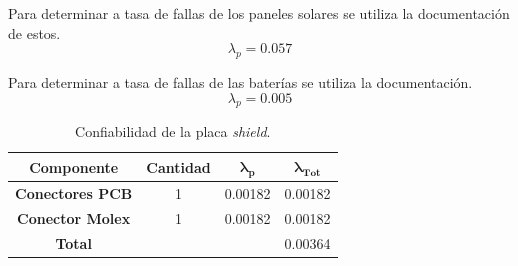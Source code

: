 Para determinar a tasa de fallas de los paneles solares se utiliza la documentación de estos.
\begin{equation}
\lambda_p = 0.057 
\end{equation}

Para determinar a tasa de fallas de las baterías se utiliza la documentación.
\begin{equation}
\lambda_p = 0.005 
\end{equation}
\begin{table}[H]
\centering
\begin{tabular}{|c|ccc|}
\hline
\textbf{Componente}     & \multicolumn{1}{c|}{\textbf{Cantidad}} & \multicolumn{1}{c|}{$\boldsymbol{\lambda_p}$}        & $\boldsymbol{\lambda_{Tot}}$ \\ \hline
\textbf{Conectores PCB} & \multicolumn{1}{c|}{1}                 & \multicolumn{1}{c|}{\cellcolor[HTML]{FFFFFF}0.00182} & 0.00182                      \\ \hline
\textbf{Conector Molex} & \multicolumn{1}{c|}{1}                 & \multicolumn{1}{c|}{\cellcolor[HTML]{FFFFFF}0.00182} & 0.00182                      \\ \hline
\textbf{Total}          & \multicolumn{1}{l}{}                   & \multicolumn{1}{l}{\cellcolor[HTML]{FFFFFF}}         & \multicolumn{1}{r|}{0.00364} \\ \hline
\end{tabular}
\caption{Confiabilidad de la placa \textit{shield}.}
\label{confshield}
\end{table}

